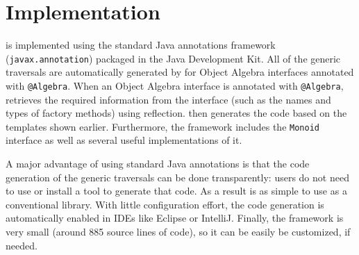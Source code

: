 \section{\name Implementation}


\name is implemented using the standard Java annotations framework
(\lstinline{javax.annotation}) packaged in the Java Development Kit.
All of the generic traversals are automatically generated
by \name for Object Algebra interfaces annotated with \lstinline{@Algebra}.
When an Object Algebra interface is annotated with \lstinline{@Algebra}, \name retrieves the required information from the interface (such as the names and types of factory methods) using reflection. \name then generates the code based on the templates shown earlier.
Furthermore, the \name framework includes the \lstinline{Monoid} interface as well as several
useful implementations of it.


A major advantage of using standard Java annotations is that the code generation of the generic traversals can be done transparently: users do not need to use or install a tool to generate that code. As a result \name is as simple to use as a conventional library.
With little configuration effort, the code generation is automatically enabled in IDEs like Eclipse or IntelliJ. Finally, the framework is very small (around 885 source lines of code), so it can be easily be customized, if needed.



